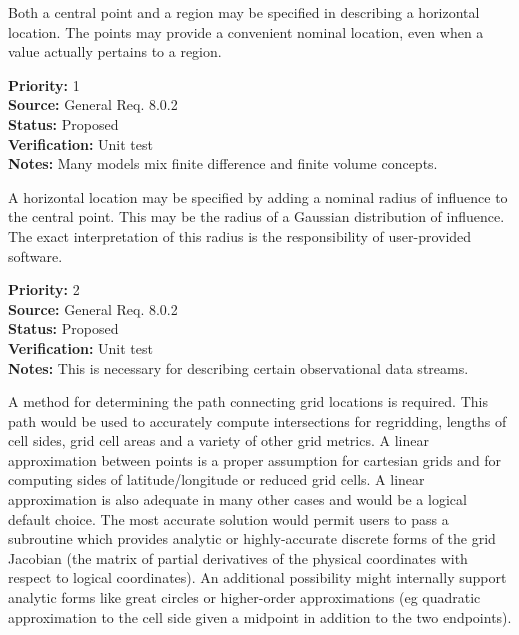 
  Both a central point and a region may be specified in describing a horizontal
location.  The points may provide a convenient nominal location, even when
a value actually pertains to a region.
\begin{reqlist}
{\bf Priority:} 1 \\
{\bf Source:} General Req. 8.0.2 \\
{\bf Status:} Proposed \\
{\bf Verification:} Unit test\\
{\bf Notes:} Many models mix finite difference and finite volume concepts.
\end{reqlist}


  A horizontal location may be specified by adding a nominal radius of
influence to the central point.  This may be the radius of a Gaussian
distribution of influence. The exact interpretation of this radius is
the responsibility of user-provided software.
\begin{reqlist}
{\bf Priority:} 2 \\
{\bf Source:} General Req. 8.0.2 \\
{\bf Status:} Proposed \\
{\bf Verification:} Unit test\\
{\bf Notes:} This is necessary for describing certain observational data streams.
\end{reqlist}



A method for determining the path connecting grid locations 
is required.  This path would be used to accurately compute
intersections for regridding, lengths of cell sides, grid
cell areas and a variety of other grid metrics.  A linear 
approximation between points is a proper assumption for 
cartesian grids and for computing sides of latitude/longitude
or reduced grid cells.  A linear approximation is also 
adequate in many other cases and would be a logical default choice. 
The most accurate solution would permit users to pass a 
subroutine which provides analytic or highly-accurate discrete 
forms of the grid Jacobian (the matrix of partial derivatives of 
the physical coordinates with respect to logical coordinates).  An 
additional possibility might internally support analytic forms like 
great circles or higher-order approximations (eg quadratic
approximation to the cell side given a midpoint in addition
to the two endpoints).

